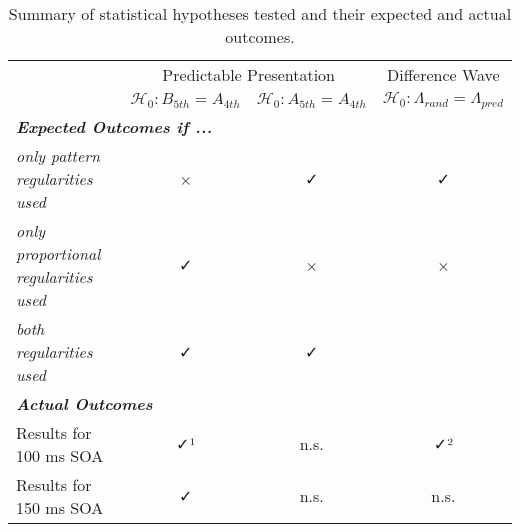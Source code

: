 

\begin{table}
\caption{Summary of statistical hypotheses tested and their expected and actual outcomes.}
\centering
 \begin{threeparttable}
\begin{tabular*}{\textwidth}{lccc} 


\toprule
                                                                                                                & \multicolumn{2}{c}{Predictable Presentation}               & Difference Wave                                                \\ 
\cmidrule(lr){2-3}\cmidrule(lr){4-4}
\multicolumn{1}{c}{}                                                                         & $\mathcal{H_0}: B_{5th}=A_{4th}$     & $\mathcal{H_0}: A_{5th}=A_{4th}$     & \multicolumn{1}{c}{$\mathcal{H_0}: \Lambda_{rand} = \Lambda_{pred}$ }  \\ 
\midrule
\multicolumn{4}{l}{\textbf{\textit{Expected Outcomes if ...}}}  \\
\hspace{3mm}\textit{only pattern regularities used}                                                                                         & \multicolumn{1}{c}{×} & \multicolumn{1}{c}{✓} & \multicolumn{1}{c}{✓}\\
\hspace{3mm}\textit{only proportional regularities used}                                                                                    & \multicolumn{1}{c}{✓} & \multicolumn{1}{c}{×} & \multicolumn{1}{c}{×}\\
\hspace{3mm}\textit{both regularities used}                                								         & \multicolumn{1}{c}{✓} & \multicolumn{1}{c}{✓} & \multicolumn{1}{c}{}\\
\multicolumn{4}{l}{\textbf{\textit{Actual Outcomes}}}  \\
\hspace{3mm}Results for 100 ms SOA                                                                                                                      & \multicolumn{1}{c}{✓¹}                 & \multicolumn{1}{c}{n.s.}                    & \multicolumn{1}{c}{✓²}                                      \\
\hspace{3mm}Results for 150 ms SOA                                                                                                                      & \multicolumn{1}{c}{✓}                      & \multicolumn{1}{c}{n.s.}                    & \multicolumn{1}{c}{n.s.}                                    \\

\end{tabular*}
\end{threeparttable}
\end{table}
